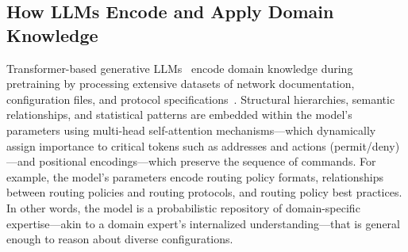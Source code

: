     


\subsection{How LLMs Encode and Apply Domain Knowledge}

 Transformer-based generative LLMs~\cite{vaswani2017attention,hill2024transformers,lin2022survey} encode domain knowledge during pretraining by processing extensive datasets of network documentation, configuration files, and protocol specifications~\cite{qiu2020pre,achiam2023gpt,touvron2023llama,brown2020language}. 
Structural hierarchies, semantic relationships, and statistical patterns are embedded within the model’s parameters using multi-head self-attention mechanisms---which dynamically assign importance to critical tokens such as addresses and actions (permit/deny)---and positional encodings---which preserve the sequence of commands. For example, the model's parameters encode routing policy formats, relationships between routing policies and routing protocols, and routing policy best practices. In other words, the model is a probabilistic repository of domain-specific expertise---akin to a domain expert's internalized understanding---that is general enough to reason about diverse configurations.


